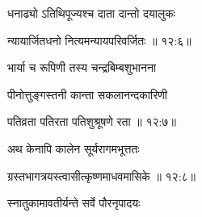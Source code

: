 {\devanagarifont धनाढ्यो ऽतिथिपूज्यश्च दाता दान्तो दयालुकः \thinspace{\dandab} \dontdisplaylinenum }%


{\devanagarifont न्यायार्जितधनो नित्यमन्यायपरिवर्जितः {॥ १२:६॥} \veg\dontdisplaylinenum }%

{\devanagarifont भार्या च रूपिणी तस्य चन्द्रबिम्बशुभानना \thinspace{\dandab} \dontdisplaylinenum }%

{\devanagarifont पीनोत्तुङ्गस्तनी कान्ता सकलानन्दकारिणी  \danda\dontdisplaylinenum }%


{\devanagarifont पतिव्रता पतिरता पतिशुश्रूषणे रता {॥ १२:७॥} \veg\dontdisplaylinenum }%

{\devanagarifont अथ केनापि कालेन सूर्यरागमभूत्ततः \thinspace{\dandab} \dontdisplaylinenum }%


{\devanagarifont ग्रस्तभागत्रयस्त्वासीत्कृष्णमाधवमासिके {॥ १२:८॥} \veg\dontdisplaylinenum }%
 
{\devanagarifont स्नातुकामावतीर्यन्ते सर्वे पौरनृपादयः \thinspace{\dandab} \dontdisplaylinenum }%

